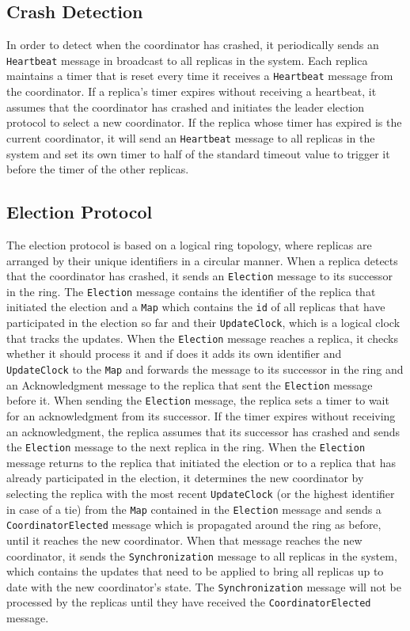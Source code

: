 \subsection{Crash Detection}
In order to detect when the coordinator has crashed, it periodically sends an
\texttt{Heartbeat} message in broadcast to all replicas in the system.
Each replica maintains a timer that is reset every time it receives a 
\texttt{Heartbeat} message from the coordinator.
If a replica's timer expires without receiving a heartbeat, 
it assumes that the coordinator has crashed and initiates the leader election protocol 
to select a new coordinator.
If the replica whose timer has expired is the current coordinator, 
it will send an \texttt{Heartbeat} message to all replicas in the system 
and set its own timer to half of the standard timeout value to trigger it 
before the timer of the other replicas.

\subsection{Election Protocol}
The election protocol is based on a logical ring topology, 
where replicas are arranged by their unique identifiers in a circular manner.
When a replica detects that the coordinator has crashed, 
it sends an \texttt{Election} message to its successor in the ring.
The \texttt{Election} message contains the identifier of the replica 
that initiated the election and a \texttt{Map} which contains the \texttt{id}
of all replicas that have participated in the election so far and their
\texttt{UpdateClock}, which is a logical clock that tracks the updates.
When the \texttt{Election} message reaches a replica, it checks whether it 
should process it and if does it adds its own identifier and 
\texttt{UpdateClock} to the \texttt{Map} and forwards the message to 
its successor in the ring and an Acknowledgment message to the replica 
that sent the \texttt{Election} message before it.
When sending the \texttt{Election} message, the replica sets a timer 
to wait for an acknowledgment from its successor.
If the timer expires without receiving an acknowledgment,
the replica assumes that its successor has crashed and sends the 
\texttt{Election} message to the next replica in the ring.
When the \texttt{Election} message returns to the replica that initiated the election
or to a replica that has already participated in the election,
it determines the new coordinator by selecting the replica with the 
most recent \texttt{UpdateClock} (or the highest identifier in case of a tie) 
from the \texttt{Map} contained in the \texttt{Election} message and 
sends a \texttt{CoordinatorElected} message which is propagated around the ring 
as before, until it reaches the new coordinator.
When that message reaches the new coordinator, it sends the 
\texttt{Synchronization} message to all replicas in the system, 
which contains the updates that need to be applied to bring all replicas up to date 
with the new coordinator's state.
The \texttt{Synchronization} message will not be processed by the replicas until 
they have received the \texttt{CoordinatorElected} message.

